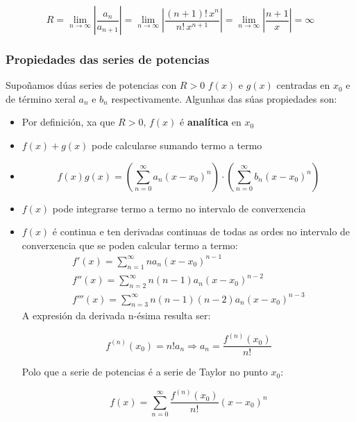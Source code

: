 \documentclass[a4paper,12pt,titlepage]{article}
\begin{document}
\begin{equation*}
    R = \lim_{n \to \infty}\left|\frac{a_{n}}{a_{n+1}}\right| = \lim_{n \to \infty} \left |\frac{(n+1)!\,x^n}{n!\,x^{n+1}}\right | = \lim_{n \to \infty} \left |\frac{n+1}{x}\right | = \infty
\end{equation*}

\subsubsection{Propiedades das series de potencias}

Supoñamos dúas series de potencias con $R>0$ $f(x)$ e $g(x)$ centradas en $x_0$ e de término xeral $a_n$ e $b_n$ respectivamente. Algunhas das súas propiedades son:

\begin{itemize}
    \item Por definición, xa que $R>0$, $f(x)$ é \textbf{analítica} en $x_0$
    \item $f(x)+g(x)$ pode calcularse sumando termo a termo
    \item \begin{equation*}
        f(x)g(x)= \left (\sum_{n=0}^{\infty}a_n(x-x_0)^n \right )\cdot \left (\sum_{n=0}^{\infty}b_n(x-x_0)^n \right )
    \end{equation*}
    \item $f(x)$ pode integrarse termo a termo no intervalo de converxencia
    \item $f(x)$ é continua e ten derivadas continuas de todas as ordes no intervalo de converxencia que se poden calcular termo a termo:
    \begin{equation*}
        \begin{gathered}
            f'(x) = \sum_{n=1}^{\infty} na_n(x-x_0)^{n-1}\\
            f''(x) = \sum_{n=2}^{\infty} n(n-1)a_n(x-x_0)^{n-2} \\
            f'''(x)= \sum_{n=3}^{\infty} n(n-1)(n-2)a_n(x-x_0)^{n-3}
        \end{gathered}
    \end{equation*}
    A expresión da derivada n-ésima resulta ser:

    \begin{equation*}
        f^{(n)}(x_0) = n!a_n \Rightarrow a_n =\frac{f^{(n)}(x_0)}{n!}
    \end{equation*}

    Polo que a serie de potencias é a serie de Taylor no punto $x_0$:

    \begin{equation*}
        f(x)=\sum_{n=0}^{\infty} \frac{f^{(n)}(x_0)}{n!} (x-x_0)^n
    \end{equation*}
\end{itemize}
\end{document}

